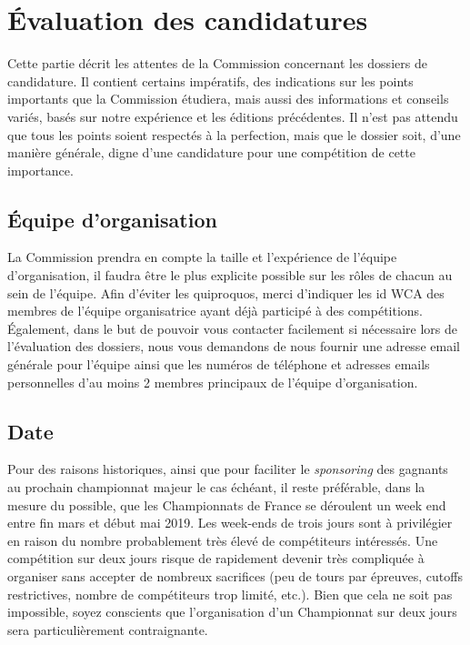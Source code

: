 \documentclass[a4paper,12pt]{scrartcl}
\begin{document}
\pagebreak
\section*{Évaluation des candidatures}

Cette partie décrit les attentes de la Commission concernant les dossiers de candidature. Il contient certains impératifs, des indications sur les points importants que la Commission étudiera, mais aussi des informations et conseils variés, basés sur notre expérience et les éditions précédentes. Il n'est pas attendu que tous les points soient respectés à la perfection, mais que le dossier soit, d'une manière générale, digne d'une candidature pour une compétition de cette importance.


\subsection*{Équipe d'organisation}

La Commission prendra en compte la taille et l'expérience de l'équipe d'organisation, il faudra être le plus explicite possible sur les rôles de chacun au sein de l'équipe. Afin d'éviter les quiproquos, merci d'indiquer les id WCA des membres de l'équipe organisatrice ayant déjà participé à des compétitions. Également, dans le but de pouvoir vous contacter facilement si nécessaire lors de l'évaluation des dossiers, nous vous demandons de nous fournir une adresse email générale pour l'équipe ainsi que les numéros de téléphone et adresses emails personnelles d'au moins 2 membres principaux de l'équipe d'organisation.


\subsection*{Date}

Pour des raisons historiques, ainsi que pour faciliter le \emph{sponsoring} des gagnants au prochain championnat majeur le cas échéant, il reste préférable, dans la mesure du possible, que les Championnats de France se déroulent un week end entre fin mars et début mai 2019.
Les week-ends de trois jours sont à privilégier en raison du nombre probablement très élevé de compétiteurs intéressés. Une compétition sur deux jours risque de rapidement devenir très compliquée à organiser sans accepter de nombreux sacrifices (peu de tours par épreuves, cutoffs restrictives, nombre de compétiteurs trop limité, etc.). Bien que cela ne soit pas impossible, soyez conscients que l'organisation d'un Championnat sur deux jours sera particulièrement contraignante.
\end{document}
